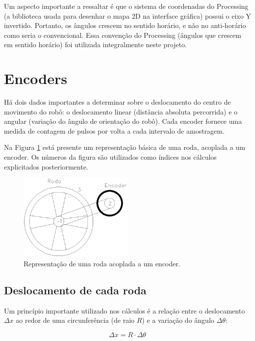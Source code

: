 Um aspecto importante a ressaltar é que o sistema de coordenadas do Processing (a biblioteca usada para desenhar o mapa 2D na interface gráfica) possui o eixo Y invertido. Portanto, os ângulos crescem no sentido horário, e não no anti-horário como seria o convencional. Essa convenção do Processing (ângulos que crescem em sentido horário) foi utilizada integralmente neste projeto.

\section{Encoders}

Há dois dados importantes a determinar sobre o deslocamento do centro de movimento do robô: o deslocamento linear (distância absoluta percorrida) e o angular (variação do ângulo de orientação do robô). Cada encoder fornece uma medida de contagem de pulsos por volta a cada intervalo de amostragem. 

Na Figura \ref{fig:roda_encoder} está presente um representação básica de uma roda, acoplada a um encoder. Os números da figura são utilizados como índices nos cálculos explicitados posteriormente.

\begin{figure}[H]
  \centering
  \includegraphics[width=0.5\textwidth, keepaspectratio]{./figuras/robo/roda_encoder.png}
  \caption{Representação de uma roda acoplada a um encoder.}
  \label{fig:roda_encoder}
\end{figure}

\subsection{Deslocamento de cada roda}

Um princípio importante utilizado nos cálculos é a relação entre o deslocamento $\Delta x$ ao redor de uma circunferência (de raio $R$) e a variação do ângulo $\Delta \theta$:

\begin{equation}
  \Delta x = R \cdot \Delta \theta
  \label{eq:deslocamento_circunferencia}
\end{equation}

